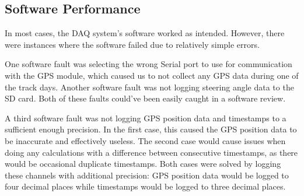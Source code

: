 \subsection{Software Performance}
In most cases, the DAQ system's software worked as intended.
However, there were instances where the software failed due to relatively simple errors.
\vspace{1em}

One software fault was selecting the wrong Serial port to use for communication with the GPS module, which caused us to not collect any GPS data during one of the track days.
Another software fault was not logging steering angle data to the SD card.
Both of these faults could've been easily caught in a software review.
\vspace{1em}

A third software fault was not logging GPS position data and timestamps to a sufficient enough precision.
In the first case, this caused the GPS position data to be inaccurate and effectively useless.
The second case would cause issues when doing any calculations with a difference between consecutive timestamps, as there would be occasional duplicate timestamps.
Both cases were solved by logging these channels with additional precision: GPS position data would be logged to four decimal places while timestamps would be logged to three decimal places.
